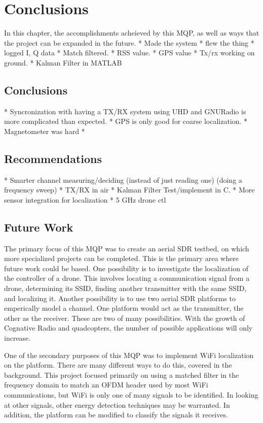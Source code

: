 \chapter{Conclusions}
In this chapter, the accomplishments acheieved by this MQP, as well as ways that 
the project can be expanded in the future. 
 * Made the system
 * flew the thing
 * logged I, Q data
 * Match filtered.
 * RSS value.
 * GPS value
 * Tx/rx working on ground.
 * Kalman Filter in MATLAB

\section{Conclusions} %
 * Syncronization with having a TX/RX system using UHD and GNURadio is more complicated than expected.
 * GPS is only good for coarse localization.
 * Magnetometer was hard
 * 

\section{Recommendations}
 * Smarter channel measuring/deciding (instead of just reading one) (doing a frequency sweep)
 * TX/RX in air
 * Kalman Filter Test/implement in C.
 * More sensor integration for localization
 * 5 GHz drone ctl


\section{Future Work}
The primary focus of this MQP was to create an aerial SDR testbed, on which more 
specialized projects can be completed. This is the primary area where future work
could be based. One possibility is to investigate the localization of the controller
of a drone. This involves locating a communication signal from a drone, determining its
SSID, finding another transmitter with the same SSID, and localizing it. Another possibility
is to use two aerial SDR platforms to emperically model a channel. One platform
would act as the transmitter, the other as the receiver. These are two of many possibilities.
With the growth of Cognative Radio and quadcopters, the number of possible applications
will only increase.\par

One of the secondary purposes of this MQP was to implement WiFi localization on 
the platform. There are many different ways to do this, covered in the background.
This project focused primarily on using a matched filter in the frequency domain to match
an OFDM header used by most WiFi communications, but WiFi is only one of many 
signals to be identified. In looking at other signals, other energy detection
techniques may be warranted. In addition, the platform can be modified to 
classify the signals it receives.\par

